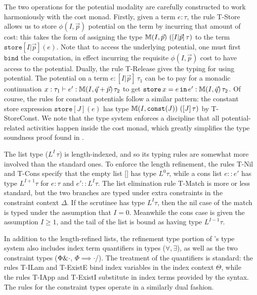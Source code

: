 The two operations for the potential modality are carefully constructed to work harmoniously with the cost monad. Firstly, given a term $e : \tau$, the rule T-Store allows us to store $\phi(I,\vec{p})$ potential on the term by incurring that amount of cost: this takes the form of assigning the type $\mathbb{M}(I,\vec{p}) \, \left([I|\vec{p}] \, \tau\right)$ to the term $\texttt{store}[I|\vec{p}](e)$. Note that to access the underlying potential, one must first $\texttt{bind}$ the computation, in effect incurring the requisite $\phi(I,\vec{p})$ cost to have access to the potential. Dually, the rule T-Release gives the typing for using potential. The potential on a term $e : [I|\vec{p}] \, \tau_1$ can be to pay for a monadic continuation $x : \tau_1 \vdash e' : \mathbb{M}(I,\vec{q} + \vec{p}) \, \tau_2$ to get
$\texttt{store}\, x = e \, \texttt{in} \, e' : \mathbb{M}(I,\vec{q}) \, \tau_2$. Of course, the rules for constant potentials follow a similar pattern: the constant store expression $\texttt{store}[J](e)$ has type $\mathbb{M}(I,\texttt{const}(J)) \, \left([J] \, \tau\right)$ by T-StoreConst.
We note that the type system enforces a discipline that all potential-related activities happen inside the cost monad, which greatly simplifies the type soundness proof found in \citet{rajani-et-al:popl21}.

The list type ($L^I \, \tau$) is length-indexed, and so its typing rules are somewhat more involved than the standard ones. To enforce the length refinement, the rules T-Nil and T-Cons specify that the empty list $\texttt{[]}$ has type $L^0 \tau$, while a cons list $e :: e'$ has type $L^{I+1} \tau$ for $e : \tau$ and $e' :: L^I \tau$. The list elimination rule T-Match is more or less standard, but the two branches are typed under extra constraints in the constraint context $\Delta$. If the scrutinee has type $L^I \tau$, then the nil case of the match is typed under the assumption that $I = 0$. Meanwhile the cons case is given the assumption $I \geq 1$, and the tail of the list is bound as having type $L^{I-1} \tau$.

In addition to the length-refined lists, the refinement type portion of \dlambdaamor's type system also includes index term quantifiers in types ($\forall,\exists$), as well as the two constraint types ($\Phi \& \cdot$, $\Phi \implies \cdot$/).  The treatment of the quantifiers is standard: the rules T-ILam and T-ExistE bind index variables in the index context $\Theta$, while the rules T-IApp and T-ExistI substitute in index terms provided by the syntax. The rules for the constraint types operate in a similarly dual fashion.

